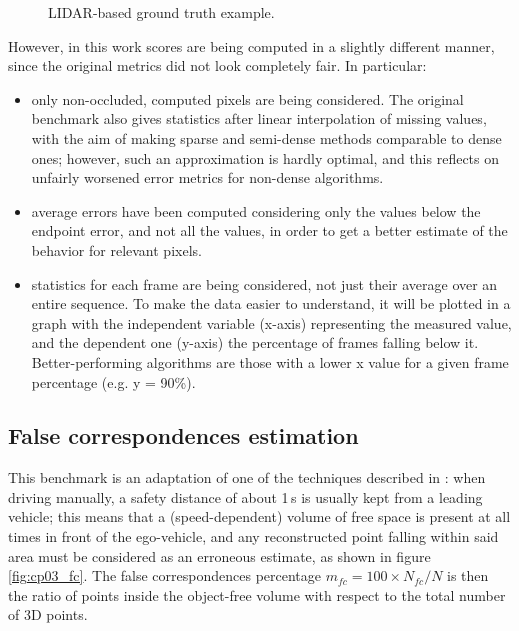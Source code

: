 \begin{figure}[h!]
        \caption{\ac{LIDAR}-based ground truth example.}\label{fig:cp03_lidarGT}
\end{figure}

However, in this work scores are being computed in a slightly different manner, since the original metrics did not look completely fair. In particular:
\begin{itemize}
\item only non-occluded, computed pixels are being considered. The original benchmark also gives statistics after linear interpolation of missing values, with the aim of making sparse and semi-dense methods comparable to dense ones; however, such an approximation is hardly optimal, and this reflects on unfairly worsened error metrics for non-dense algorithms.
\item average errors have been computed considering only the values below the endpoint error, and not all the values, in order to get a better estimate of the behavior for relevant pixels.
\item statistics for each frame are being considered, not just their average over an entire sequence. To make the data easier to understand, it will be plotted in a graph with the independent variable (x-axis) representing the measured value, and the dependent one (y-axis) the percentage of frames falling below it. Better-performing algorithms are those with a lower x value for a given frame percentage (e.g. y = 90\%).
\end{itemize}

\subsection{False correspondences estimation}\label{ch:chapter03_02}

This benchmark is an adaptation of one of the techniques described in \cite{Steingrube2009}: when driving manually, a safety distance of about 1\,s is usually kept from a leading vehicle; this means that a (speed-dependent) volume of free space is present at all times in front of the ego-vehicle, and any reconstructed point falling within said area must be considered as an erroneous estimate, as shown in figure \ref{fig:cp03_fc}. The false correspondences percentage $m_{fc} = 100 \times N_{fc} / N$ is then the ratio of points inside the object-free volume with respect to the total number of 3D points.

